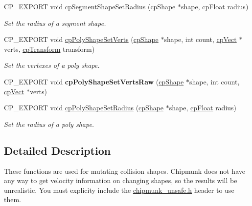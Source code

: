 \begin{DoxyCompactItemize}
\mbox{\label{group__unsafe_ga712a6fe0c9b1f3a4f4c32cacb56485c7}} 
C\+P\+\_\+\+E\+X\+P\+O\+RT void \mbox{\hyperlink{group__unsafe_ga712a6fe0c9b1f3a4f4c32cacb56485c7}{cp\+Segment\+Shape\+Set\+Radius}} (\mbox{\hyperlink{structcp_shape}{cp\+Shape}} $\ast$shape, \mbox{\hyperlink{group__basic_types_gac1ed65573e035bf892505768c852d8d3}{cp\+Float}} radius)
\begin{DoxyCompactList}\small\item\em Set the radius of a segment shape. \end{DoxyCompactList}\item 
\mbox{\label{group__unsafe_gad5046c7627cb0ad37751c6ad5d4ad8b7}} 
C\+P\+\_\+\+E\+X\+P\+O\+RT void \mbox{\hyperlink{group__unsafe_gad5046c7627cb0ad37751c6ad5d4ad8b7}{cp\+Poly\+Shape\+Set\+Verts}} (\mbox{\hyperlink{structcp_shape}{cp\+Shape}} $\ast$shape, int count, \mbox{\hyperlink{structcp_vect}{cp\+Vect}} $\ast$verts, \mbox{\hyperlink{structcp_transform}{cp\+Transform}} transform)
\begin{DoxyCompactList}\small\item\em Set the vertexes of a poly shape. \end{DoxyCompactList}\item 
\mbox{\label{group__unsafe_ga6911a79495d7d7233cb2fa6d0b3f1eeb}} 
C\+P\+\_\+\+E\+X\+P\+O\+RT void {\bfseries cp\+Poly\+Shape\+Set\+Verts\+Raw} (\mbox{\hyperlink{structcp_shape}{cp\+Shape}} $\ast$shape, int count, \mbox{\hyperlink{structcp_vect}{cp\+Vect}} $\ast$verts)
\item 
\mbox{\label{group__unsafe_ga8a7d3c9e6117f0c7162c47ca73ae7226}} 
C\+P\+\_\+\+E\+X\+P\+O\+RT void \mbox{\hyperlink{group__unsafe_ga8a7d3c9e6117f0c7162c47ca73ae7226}{cp\+Poly\+Shape\+Set\+Radius}} (\mbox{\hyperlink{structcp_shape}{cp\+Shape}} $\ast$shape, \mbox{\hyperlink{group__basic_types_gac1ed65573e035bf892505768c852d8d3}{cp\+Float}} radius)
\begin{DoxyCompactList}\small\item\em Set the radius of a poly shape. \end{DoxyCompactList}\end{DoxyCompactItemize}


\subsection{Detailed Description}
These functions are used for mutating collision shapes. Chipmunk does not have any way to get velocity information on changing shapes, so the results will be unrealistic. You must explicity include the \mbox{\hyperlink{chipmunk__unsafe_8h_source}{chipmunk\+\_\+unsafe.\+h}} header to use them. 